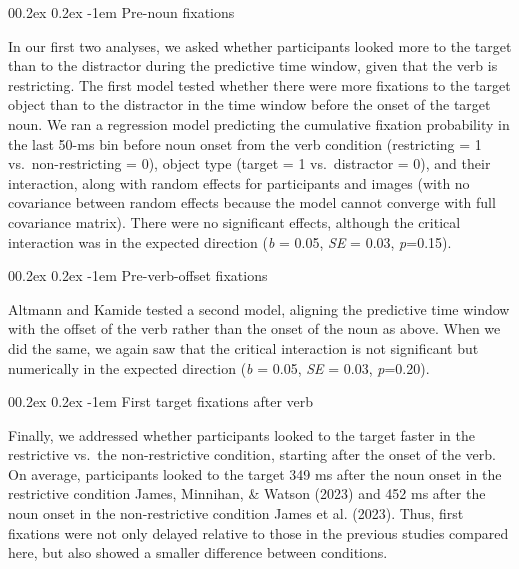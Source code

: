 \documentclass[
  man,floatsintext]{apa6}
\makeatletter
\let\oldparagraph\paragraph
\renewcommand{\paragraph}[1]{\oldparagraph{#1}\mbox{}}
\renewcommand{\paragraph}{\@startsection{paragraph}{4}{\parindent}%
  {0\baselineskip \@plus 0.2ex \@minus 0.2ex}%
  {-1em}%
  {\normalfont\normalsize\bfseries\itshape\typesectitle}}
\makeatother
\begin{document}
\paragraph{Pre-noun fixations}\label{pre-noun-fixations}

In our first two analyses, we asked whether participants looked more to the target than to the distractor during the predictive time window, given that the verb is restricting. The first model tested whether there were more fixations to the target object than to the distractor in the time window before the onset of the target noun. We ran a regression model predicting the cumulative fixation probability in the last 50-ms bin before noun onset from the verb condition (restricting = 1 vs.~non-restricting = 0), object type (target = 1 vs.~distractor = 0), and their interaction, along with random effects for participants and images (with no covariance between random effects because the model cannot converge with full covariance matrix). There were no significant effects, although the critical interaction was in the expected direction (\emph{b} = 0.05, \emph{SE} = 0.03, \emph{p}=0.15).

\paragraph{Pre-verb-offset fixations}\label{pre-verb-offset-fixations}

Altmann and Kamide tested a second model, aligning the predictive time window with the offset of the verb rather than the onset of the noun as above. When we did the same, we again saw that the critical interaction is not significant but numerically in the expected direction (\emph{b} = 0.05, \emph{SE} = 0.03, \emph{p}=0.20).

\paragraph{First target fixations after verb}\label{first-target-fixations-after-verb}

Finally, we addressed whether participants looked to the target faster in the restrictive vs.~the non-restrictive condition, starting after the onset of the verb. On average, participants looked to the target 349 ms after the noun onset in the restrictive condition James, Minnihan, \& Watson (2023) and 452 ms after the noun onset in the non-restrictive condition James et al. (2023). Thus, first fixations were not only delayed relative to those in the previous studies compared here, but also showed a smaller difference between conditions.
\end{document}
